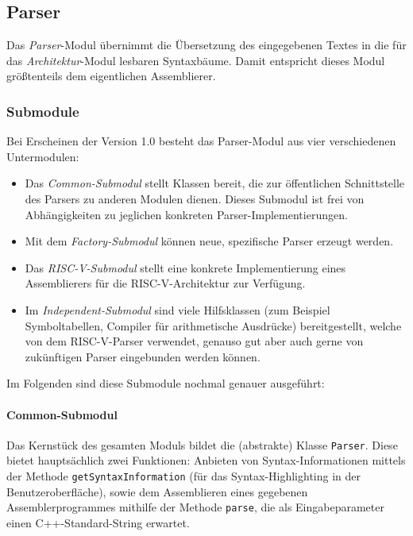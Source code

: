\subsection{Parser}

Das \textit{Parser}-Modul übernimmt die Übersetzung des eingegebenen Textes in
die für das \textit{Architektur}-Modul lesbaren Syntaxbäume. Damit entspricht
dieses Modul größtenteils dem eigentlichen Assemblierer.

\subsubsection{Submodule}

Bei Erscheinen der Version 1.0 besteht das Parser-Modul aus vier verschiedenen Untermodulen:

\begin{itemize}

\item Das \emph{Common-Submodul} stellt Klassen bereit, die zur öffentlichen
Schnittstelle des Parsers zu anderen Modulen dienen. Dieses Submodul ist frei
von Abhängigkeiten zu jeglichen konkreten Parser-Implementierungen.

\item Mit dem \emph{Factory-Submodul} können neue, spezifische Parser erzeugt
werden.

\item Das \emph{RISC-V-Submodul} stellt eine konkrete Implementierung eines
Assemblierers für die RISC-V-Architektur zur Verfügung.

\item Im \emph{Independent-Submodul} sind viele Hilfsklassen (zum Beispiel
Symboltabellen, Compiler für arithmetische Ausdrücke) bereitgestellt, welche von
dem RISC-V-Parser verwendet, genauso gut aber auch gerne von zukünftigen Parser
eingebunden werden können.

\end{itemize}

Im Folgenden sind diese Submodule nochmal genauer ausgeführt:

\paragraph{Common-Submodul}

Das Kernstück des gesamten Moduls bildet die (abstrakte) Klasse \texttt{Parser}.
Diese bietet hauptsächlich zwei Funktionen: Anbieten von Syntax-Informationen
mittels der Methode \texttt{getSyntaxInformation} (für das Syntax-Highlighting in
der Benutzeroberfläche), sowie dem Assemblieren eines gegebenen
Assemblerprogrammes mithilfe der Methode \texttt{parse}, die als
Eingabeparameter einen C++-Standard-String erwartet.

